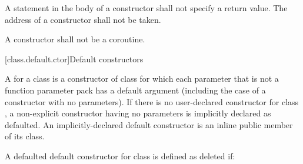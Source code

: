 \pnum
{}%
A
statement in the body of a constructor shall not specify a return value.
%
The address of a constructor shall not be taken.

\pnum
A constructor shall not be a coroutine.

[class.default.ctor]{Default constructors}

\pnum
{}%
%
A  for a class 
is a constructor of class 
for which each parameter
that is not a function parameter pack
has a default argument
(including the case of a constructor with no parameters).
%
If there is no user-declared constructor for class
,
a non-explicit constructor having no parameters is implicitly declared
as defaulted.
An implicitly-declared default constructor is an
inline public member of its class.

\pnum
A defaulted default constructor for class  is defined as deleted if:


